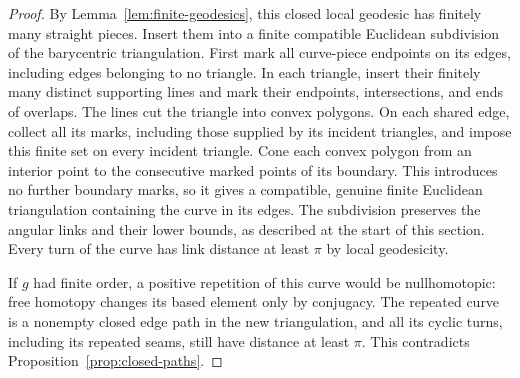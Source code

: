 \begin{proof}
By Lemma~\ref{lem:finite-geodesics}, this closed local geodesic has
finitely many straight pieces. Insert them into a finite compatible
Euclidean subdivision of the barycentric triangulation. First mark all
curve-piece endpoints on its edges, including edges belonging to no
triangle. In each triangle, insert their finitely many distinct supporting lines and mark
their endpoints, intersections, and ends of overlaps. The lines cut
the triangle into convex polygons. On each shared edge, collect all
its marks, including those supplied by its incident triangles, and impose this
finite set on every incident triangle. Cone each convex polygon from
an interior point to the consecutive marked points of its boundary.
This introduces no further boundary marks, so it gives a compatible,
genuine finite Euclidean triangulation containing the curve in its
edges. The
subdivision preserves the angular links and their lower bounds, as
described at the start of this section. Every turn of the curve has
link distance at least $\pi$ by local geodesicity.

If $g$ had finite order, a positive repetition of this curve would be
nullhomotopic: free homotopy changes its based element only by
conjugacy. The repeated curve is a nonempty closed edge path in the
new triangulation, and all its cyclic turns, including its repeated
seams, still have distance at least $\pi$. This contradicts
Proposition~\ref{prop:closed-paths}.
\end{proof}
